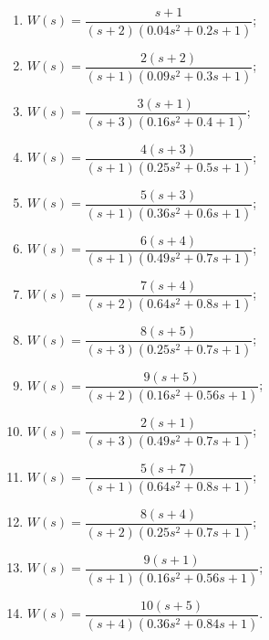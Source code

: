 \documentclass[a4paper,oneside,10pt]{book}
\theoremstyle{definition}
\begin{document}
\begin{multicols}{2}


	\begin{enumerate}
		\item

		      $ 	W(s) =
			      \dfrac{s+1}
			      {(s+2)(0.04s^2 + 0.2s+1)} $;
		\item

		      $ 	W(s) =
			      \dfrac{2(s+2)}
			      {(s+1)(0.09s^2+0.3s+1)} $;

		\item

		      $ 		W(s) =
			      \dfrac{3(s+1)}
			      {(s+3)(0.16s^2+0.4+1)} $;

		\item

		      $ 	W(s) =
			      \dfrac{4(s+3)}
			      {(s+1)(0.25s^2+0.5s+1)} $;

		\item

		      $ 	W(s) =
			      \dfrac{5(s+3)}
			      {(s+1)(0.36s^2+0.6s+1)} $;

		\item

		      $ 	W(s) =
			      \dfrac{6(s+4)}
			      {(s+1)(0.49s^2+0.7s+1)} $;

		\item

		      $ W(s) =
			      \dfrac{7(s+4)}
			      {(s+2)(0.64s^2+0.8s+1)} $;

		\item

		      $ W(s) =
			      \dfrac{8(s+5)}
			      {(s+3)(0.25s^2+0.7s+1)} $;

		\item

		      $ W(s) =
			      \dfrac{9(s+5)}
			      {(s+2)(0.16s^2+0.56s+1)} $;





		\item

		      $ 	W(s) =
			      \dfrac{2(s+1)}
			      {(s+3)(0.49s^2+0.7s+1)} $;

		\item

		      $ W(s) =
			      \dfrac{5(s+7)}
			      {(s+1)(0.64s^2+0.8s+1)} $;

		\item

		      $ W(s) =
			      \dfrac{8(s+4)}
			      {(s+2)(0.25s^2+0.7s+1)} $;

		\item

		      $ W(s) =
			      \dfrac{9(s+1)}
			      {(s+1)(0.16s^2+0.56s+1)} $;




		\item

		      $ W(s) =
			      \dfrac{10(s+5)}
			      {(s+4)(0.36s^2+0.84s+1)} $.


	\end{enumerate}
\end{multicols}
\end{document}
